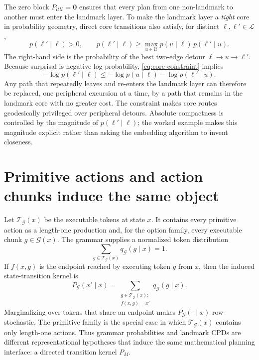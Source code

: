 \documentclass[11pt]{article}
\begin{document}
The zero block $P_{\mathcal U\mathcal U}=\mathbf 0$ ensures that every plan from one
non-landmark to another must enter the landmark layer. To make the landmark layer a
\emph{tight} core in probability geometry, direct core transitions also satisfy, for
distinct $\ell,\ell'\in\mathcal L$,
\begin{equation}
p(\ell'\mid\ell)>0,
\qquad
p(\ell'\mid\ell)
\ge
\max_{u\in\mathcal U}
p(u\mid\ell)\,p(\ell'\mid u).
\label{eq:core-constraint}
\end{equation}
The right-hand side is the probability of the best two-edge detour
$\ell\to u\to\ell'$. Because surprisal is negative log probability,
\eqref{eq:core-constraint} implies
\[
-\log p(\ell'\mid\ell)
\le
-\log p(u\mid\ell)-\log p(\ell'\mid u).
\]
Any path that repeatedly leaves and re-enters the landmark layer can therefore be replaced,
one peripheral excursion at a time, by a path that remains in the landmark core with no
greater cost. The constraint makes core routes geodesically privileged over peripheral
detours. Absolute compactness is controlled by the magnitude of
$p(\ell'\mid\ell)$; the worked example makes this magnitude explicit rather than asking
the embedding algorithm to invent closeness.

\section{Primitive actions and action chunks induce the same object}
\label{sec:chunks}

Let $\mathcal T_{\mathcal G}(x)$ be the executable tokens at state $x$. It contains every
primitive action as a length-one production and, for the option family, every executable
chunk $g\in\mathcal G(x)$. The grammar supplies a normalized token distribution
\begin{equation}
\sum_{g\in\mathcal T_{\mathcal G}(x)}
q_{\mathcal G}(g\mid x)=1.
\label{eq:grammar-normalization}
\end{equation}
If $f(x,g)$ is the endpoint reached by executing token $g$ from $x$, then the induced
state-transition kernel is
\begin{equation}
P_{\mathcal G}(x'\mid x)
=
\sum_{\substack{g\in\mathcal T_{\mathcal G}(x):\\ f(x,g)=x'}}
q_{\mathcal G}(g\mid x).
\label{eq:chunk-kernel}
\end{equation}
Marginalizing over tokens that share an endpoint makes
$P_{\mathcal G}(\cdot\mid x)$ row-stochastic. The primitive family is the special case in
which $\mathcal T_{\mathcal G}(x)$ contains only length-one actions. Thus grammar
probabilities and landmark CPDs are different representational hypotheses that induce the
same mathematical planning interface: a directed transition kernel $P_M$.
\end{document}
